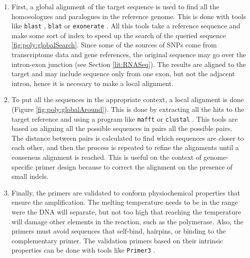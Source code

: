 \begin{enumerate}
\item First, a global alignment of the target sequence is used to find all the homoeologues and paralogues in the reference genome.
This is done with tools like \verb|blast| \citep{Altschul1990}, \verb|blat| \citep{Kent2002} or \verb|exonerate| \citep{Slater2005}.
All this tools take a reference sequence and make some sort of index to speed up the search of the queried sequence  \ref{fig:poly:globalSearch}. 
Since some of the sources of SNPs come from transcriptome data and gene references, the original sequence may go over the intron-exon junction (see Section \ref{lit:RNASeq}).  
The results are aligned to the target and may include sequence only from one exon, but not the adjacent intron, hence it is necesary to make a local alignment. 
\item To put all the sequences in the appropriate context, a local alignment is done (Figure \ref{fig:poly:globalAround}). 
This is done by extracting all the hits to the target reference and using a program like \verb|mafft| \citep{Katoh2013} or \verb|clustal| \citep{Higgins1988}. 
This tools are based on aligning all the possible sequences in pairs all the possible pairs.
The distance between pairs is calculated to find which sequences are closer to each other, and then the process is repeated to refine the alignments until a consensus alignment is reached. 
This is useful on the context of genome-specific primer design because to correct the alignment on the presence of small \gls{indels}.  
\item Finally, the primers are validated to conform physiochemical properties that ensure the amplification. 
The melting temperature needs to be in the range were the DNA will separate, but not too high that reaching the temperature will damage other elements in the reaction, such as the polymerase. 
Also, the primers must avoid sequences that self-bind, hairpins, or binding to the complementary primer. 
The validation primers based on their intrinsic properties can be done with tools like \verb|Primer3| \citep{Rozen}. 
\end{enumerate}

